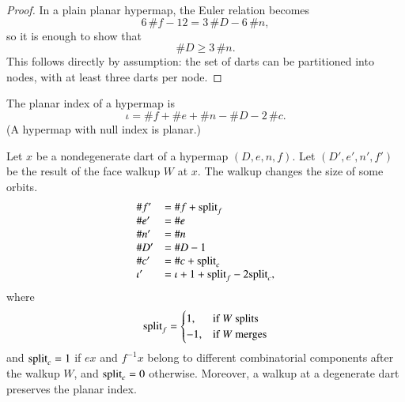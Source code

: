\begin{proof}  In a plain planar hypermap, the Euler relation becomes
\begin{displaymath}6\, \#f - 12 = 3\,\#D - 6\,\#n,\end{displaymath}
so it is enough to show that
\begin{displaymath}
\# D \ge 3\,\#n.
\end{displaymath}
This follows directly by assumption: the set of darts can be
partitioned into nodes, with at least three darts per node.
\end{proof}


\begin{definition} The planar index of a hypermap is
\begin{displaymath}\iota = \# f + \# e + \# n - \# D - 2\,\#
c.\end{displaymath}
(A hypermap with null index is planar.)
%
%
\end{definition}

\begin{lemma} 
Let $x$ be a nondegenerate dart of a hypermap $(D,e,n,f)$. Let
$(D',e',n',f')$ be the result of the face walkup $W$ at $x$.  The
walkup changes the size of some orbits.
\begin{displaymath}
\begin{array}{lll}
\# f' &=\# f +{\operatorname{split}}_f  \\  
\# e'&=\# e \\
\# n'&=\# n \\
\# D'&=\# D - 1 \\
\#c'&=\# c + {\operatorname{split}}_c\\
\iota' &= \iota + 1+{\operatorname{split}}_f - 2{\operatorname{split}}_c,\\
\end{array}
\end{displaymath}
where
\begin{displaymath}
{\operatorname{split}}_f = \begin{cases}
1,&\text{if $W$ splits }\\
-1,&\text{if $W$ merges}\\
\end{cases}
\end{displaymath}
and ${\operatorname{split}}_c=1$ if $e x$ and $f^{-1} x$ belong to different
combinatorial components after the walkup $W$, and ${\operatorname{split}}_c=0$
otherwise. Moreover, a walkup at a degenerate dart preserves the
planar index.  %
%
%
\end{lemma}

